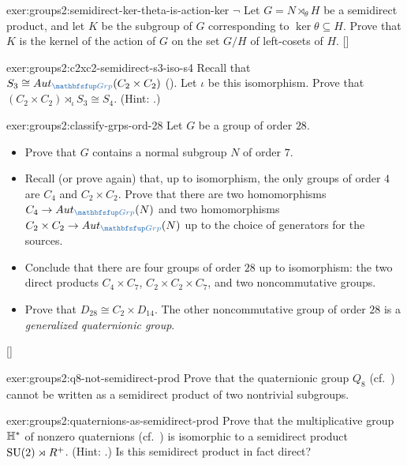 \begin{exer}{}{exer:groups2:semidirect-ker-theta-is-action-ker}
  $\lnot$ Let $G = N \rtimes_\theta H$ be a semidirect product, and
  let $K$ be the subgroup of $G$ corresponding to
  $\ker\theta \subseteq H$.  Prove that $K$ is the kernel of the
  action of $G$ on the set $G/H$ of left-cosets of
  $H$. []
\end{exer}
\begin{exer}{}{exer:groups2:c2xc2-semidirect-s3-iso-s4}
  Recall that $S_3 \cong \Aut_{\categ{Grp}}(C_2 \times C_2)$
  (). Let $\iota$ be this
  isomorphism. Prove that
  $(C_2 \times C_2) \rtimes_\iota S_3 \cong S_4$. (Hint:
  .)
\end{exer}
\begin{exer}{}{exer:groups2:classify-grps-ord-28}
  \exerused{} Let $G$ be a group of order $28$.
  \begin{itemize}
  \item Prove that $G$ contains a normal subgroup $N$ of order $7$.
  \item Recall (or prove again) that, up to isomorphism, the only
    groups of order $4$ are $C_4$ and $C_2 \times C_2$. Prove that
    there are two homomorphisms $C_4 \to \Aut_{\categ{Grp}}(N)$ and
    two homomorphisms $C_2 \times C_2 \to \Aut_{\categ{Grp}} (N)$ up
    to the choice of generators for the sources.
  \item Conclude that there are four groups of order $28$ up to
    isomorphism: the two direct products $C_4 \times C_7$,
    $C_2 \times C_2 \times C_7$, and two noncommutative groups.
  \item Prove that $D_{28} \cong C_2 \times D_{14}$. The other
    noncommutative group of order $28$ is a \emph{generalized
      quaternionic group}.
  \end{itemize}
  []
\end{exer}
\begin{exer}{}{exer:groups2:q8-not-semidirect-prod}
  Prove that the quaternionic group $Q_8$ (cf.\
  ) cannot be written as a semidirect
  product of two nontrivial subgroups.
\end{exer}
\begin{exer}{}{exer:groups2:quaternions-as-semidirect-prod}
  Prove that the multiplicative group $\mathbb{H}^*$ of nonzero
  quaternions (cf.\ ) is isomorphic to a
  semidirect product $\mathrm{SU}(2) \rtimes R^+$. (Hint:
  .) Is this semidirect product in
  fact direct?
\end{exer}

